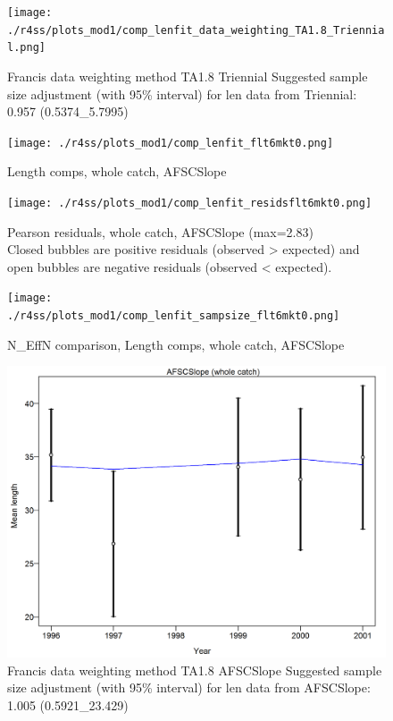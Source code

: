 \documentclass[12pt,]{article}
\begin{document}
\begin{figure}
\centering
\texttt{[image: ./r4ss/plots\_mod1/comp\_lenfit\_data\_weighting\_TA1.8\_Triennial.png]}
\caption{Francis data weighting method TA1.8 Triennial Suggested sample
size adjustment (with 95\% interval) for len data from Triennial: 0.957
(0.5374\_5.7995)
\label{fig:mod1_21_comp_lenfit_data_weighting_TA1.8_Triennial}}
\end{figure}

\begin{figure}
\centering
\texttt{[image: ./r4ss/plots\_mod1/comp\_lenfit\_flt6mkt0.png]}
\caption{Length comps, whole catch, AFSCSlope
\label{fig:mod1_22_comp_lenfit_flt6mkt0}}
\end{figure}

\begin{figure}
\centering
\texttt{[image: ./r4ss/plots\_mod1/comp\_lenfit\_residsflt6mkt0.png]}
\caption{Pearson residuals, whole catch, AFSCSlope (max=2.83)\\
Closed bubbles are positive residuals (observed \textgreater{} expected)
and open bubbles are negative residuals (observed \textless{} expected).
\label{fig:mod1_23_comp_lenfit_residsflt6mkt0}}
\end{figure}

\begin{figure}
\centering
\texttt{[image: ./r4ss/plots\_mod1/comp\_lenfit\_sampsize\_flt6mkt0.png]}
\caption{N\_EffN comparison, Length comps, whole catch, AFSCSlope
\label{fig:mod1_24_comp_lenfit_sampsize_flt6mkt0}}
\end{figure}

\begin{figure}
\centering
\includegraphics{./r4ss/plots_mod1/comp_lenfit_data_weighting_TA1.8_AFSCSlope.png}
\caption{Francis data weighting method TA1.8 AFSCSlope Suggested sample
size adjustment (with 95\% interval) for len data from AFSCSlope: 1.005
(0.5921\_23.429)
\label{fig:mod1_25_comp_lenfit_data_weighting_TA1.8_AFSCSlope}}
\end{figure}
\end{document}
